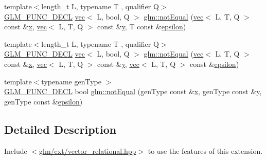 \begin{DoxyCompactItemize}
\item 
{\footnotesize template$<$length\+\_\+t L, typename T , qualifier Q$>$ }\\\hyperlink{setup_8hpp_ab2d052de21a70539923e9bcbf6e83a51}{G\+L\+M\+\_\+\+F\+U\+N\+C\+\_\+\+D\+E\+CL} \hyperlink{structglm_1_1vec}{vec}$<$ L, bool, Q $>$ \hyperlink{group__ext__vector__relational_ga59a03a51402b6e1ce80f9a3b436f17bd}{glm\+::not\+Equal} (\hyperlink{structglm_1_1vec}{vec}$<$ L, T, Q $>$ const \&\hyperlink{_s_d_l__opengl_8h_ad0e63d0edcdbd3d79554076bf309fd47}{x}, \hyperlink{structglm_1_1vec}{vec}$<$ L, T, Q $>$ const \&\hyperlink{_s_d_l__opengl_8h_a1675d9d7bb68e1657ff028643b4037e3}{y}, T const \&\hyperlink{group__gtc__constants_ga2a1e57fc5592b69cfae84174cbfc9429}{epsilon})
\item 
{\footnotesize template$<$length\+\_\+t L, typename T , qualifier Q$>$ }\\\hyperlink{setup_8hpp_ab2d052de21a70539923e9bcbf6e83a51}{G\+L\+M\+\_\+\+F\+U\+N\+C\+\_\+\+D\+E\+CL} \hyperlink{structglm_1_1vec}{vec}$<$ L, bool, Q $>$ \hyperlink{group__ext__vector__relational_ga0497a636e5e8140bb7ebc021baf86637}{glm\+::not\+Equal} (\hyperlink{structglm_1_1vec}{vec}$<$ L, T, Q $>$ const \&\hyperlink{_s_d_l__opengl_8h_ad0e63d0edcdbd3d79554076bf309fd47}{x}, \hyperlink{structglm_1_1vec}{vec}$<$ L, T, Q $>$ const \&\hyperlink{_s_d_l__opengl_8h_a1675d9d7bb68e1657ff028643b4037e3}{y}, \hyperlink{structglm_1_1vec}{vec}$<$ L, T, Q $>$ const \&\hyperlink{group__gtc__constants_ga2a1e57fc5592b69cfae84174cbfc9429}{epsilon})
\item 
{\footnotesize template$<$typename gen\+Type $>$ }\\\hyperlink{setup_8hpp_ab2d052de21a70539923e9bcbf6e83a51}{G\+L\+M\+\_\+\+F\+U\+N\+C\+\_\+\+D\+E\+CL} bool \hyperlink{group__ext__vector__relational_ga27c5118811bcfed5504e50f22693373e}{glm\+::not\+Equal} (gen\+Type const \&\hyperlink{_s_d_l__opengl_8h_ad0e63d0edcdbd3d79554076bf309fd47}{x}, gen\+Type const \&\hyperlink{_s_d_l__opengl_8h_a1675d9d7bb68e1657ff028643b4037e3}{y}, gen\+Type const \&\hyperlink{group__gtc__constants_ga2a1e57fc5592b69cfae84174cbfc9429}{epsilon})
\end{DoxyCompactItemize}


\subsection{Detailed Description}
Include $<$\hyperlink{ext_2vector__relational_8hpp}{glm/ext/vector\+\_\+relational.\+hpp}$>$ to use the features of this extension.

